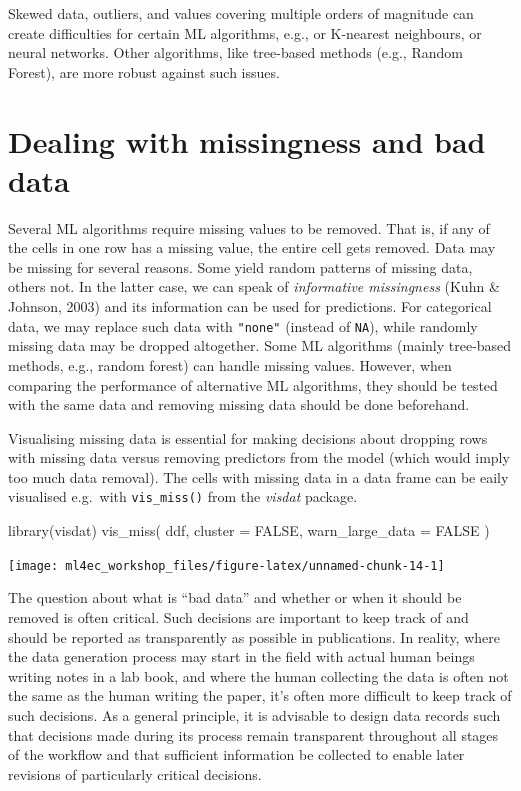 \documentclass[
]{book}
\newenvironment{Shaded}{\begin{snugshade}}{\end{snugshade}}
\newcommand{\AttributeTok}[1]{\textcolor[rgb]{0.77,0.63,0.00}{#1}}
\newcommand{\ConstantTok}[1]{\textcolor[rgb]{0.00,0.00,0.00}{#1}}
\newcommand{\FunctionTok}[1]{\textcolor[rgb]{0.00,0.00,0.00}{#1}}
\newcommand{\NormalTok}[1]{#1}
\begin{document}
Skewed data, outliers, and values covering multiple orders of magnitude can create difficulties for certain ML algorithms, e.g., or K-nearest neighbours, or neural networks. Other algorithms, like tree-based methods (e.g., Random Forest), are more robust against such issues.

\hypertarget{dealing-with-missingness-and-bad-data}{%
\section{Dealing with missingness and bad data}\label{dealing-with-missingness-and-bad-data}}

Several ML algorithms require missing values to be removed. That is, if any of the cells in one row has a missing value, the entire cell gets removed. Data may be missing for several reasons. Some yield random patterns of missing data, others not. In the latter case, we can speak of \emph{informative missingness} (Kuhn \& Johnson, 2003) and its information can be used for predictions. For categorical data, we may replace such data with \texttt{"none"} (instead of \texttt{NA}), while randomly missing data may be dropped altogether. Some ML algorithms (mainly tree-based methods, e.g., random forest) can handle missing values. However, when comparing the performance of alternative ML algorithms, they should be tested with the same data and removing missing data should be done beforehand.

Visualising missing data is essential for making decisions about dropping rows with missing data versus removing predictors from the model (which would imply too much data removal). The cells with missing data in a data frame can be eaily visualised e.g.~with \texttt{vis\_miss()} from the \emph{visdat} package.

\begin{Shaded}
\begin{Highlighting}[]
\FunctionTok{library}\NormalTok{(visdat)}
\FunctionTok{vis\_miss}\NormalTok{(}
\NormalTok{  ddf,}
  \AttributeTok{cluster =} \ConstantTok{FALSE}\NormalTok{, }
  \AttributeTok{warn\_large\_data =} \ConstantTok{FALSE}
\NormalTok{  )}
\end{Highlighting}
\end{Shaded}

\begin{center}\texttt{[image: ml4ec\_workshop\_files/figure-latex/unnamed-chunk-14-1]} \end{center}

The question about what is ``bad data'' and whether or when it should be removed is often critical. Such decisions are important to keep track of and should be reported as transparently as possible in publications. In reality, where the data generation process may start in the field with actual human beings writing notes in a lab book, and where the human collecting the data is often not the same as the human writing the paper, it's often more difficult to keep track of such decisions. As a general principle, it is advisable to design data records such that decisions made during its process remain transparent throughout all stages of the workflow and that sufficient information be collected to enable later revisions of particularly critical decisions.
\end{document}
